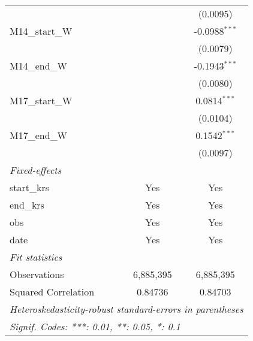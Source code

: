 \documentclass[10pt,a4paper]{article}
\begin{document}
\begin{tabular}{lcc}
                                                    &                 & (0.0095)\\   
   M14\_start\_W                                    &                 & -0.0988$^{***}$\\   
                                                    &                 & (0.0079)\\   
   M14\_end\_W                                      &                 & -0.1943$^{***}$\\   
                                                    &                 & (0.0080)\\   
   M17\_start\_W                                    &                 & 0.0814$^{***}$\\   
                                                    &                 & (0.0104)\\   
   M17\_end\_W                                      &                 & 0.1542$^{***}$\\   
                                                    &                 & (0.0097)\\   
   \midrule
   \emph{Fixed-effects}\\
   start\_krs                                       & Yes             & Yes\\  
   end\_krs                                         & Yes             & Yes\\  
   obs                                              & Yes             & Yes\\  
   date                                             & Yes             & Yes\\  
   \midrule
   \emph{Fit statistics}\\
   Observations                                     & 6,885,395       & 6,885,395\\  
   Squared Correlation                              & 0.84736         & 0.84703\\  
   \midrule \midrule
   \multicolumn{3}{l}{\emph{Heteroskedasticity-robust standard-errors in parentheses}}\\
   \multicolumn{3}{l}{\emph{Signif. Codes: ***: 0.01, **: 0.05, *: 0.1}}\\
\end{tabular}
\par\endgroup
\end{document}
